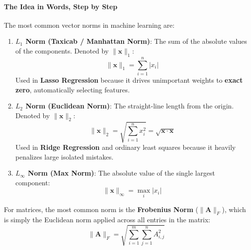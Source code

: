 \paragraph{The Idea in Words, Step by Step}
The most common vector norms in machine learning are:
\begin{enumerate}
    \item \textbf{$L_1$ Norm (Taxicab / Manhattan Norm)}: The sum of the absolute values of the components. Denoted by $\|\mathbf{x}\|_1$:
    \begin{equation}
    \|\mathbf{x}\|_1 = \sum_{i=1}^n |x_i|\label{eq:l1_norm}
    \end{equation}
    Used in \textbf{Lasso Regression} because it drives unimportant weights to \textbf{exact zero}, automatically selecting features.
    
    \item \textbf{$L_2$ Norm (Euclidean Norm)}: The straight-line length from the origin. Denoted by $\|\mathbf{x}\|_2$:
    \begin{equation}
    \|\mathbf{x}\|_2 = \sqrt{\sum_{i=1}^n x_i^2} = \sqrt{\mathbf{x} \cdot \mathbf{x}}\label{eq:l2_norm}
    \end{equation}
    Used in \textbf{Ridge Regression} and ordinary least squares because it heavily penalizes large isolated mistakes.
    
    \item \textbf{$L_\infty$ Norm (Max Norm)}: The absolute value of the single largest component:
    \begin{equation}
    \|\mathbf{x}\|_\infty = \max_{i} |x_i|\label{eq:linf_norm}
    \end{equation}
\end{enumerate}

For matrices, the most common norm is the \textbf{Frobenius Norm} ($\|\mathbf{A}\|_F$), which is simply the Euclidean norm applied across all entries in the matrix:
\begin{equation}
\|\mathbf{A}\|_F = \sqrt{\sum_{i=1}^m \sum_{j=1}^n A_{i,j}^2}\label{eq:frobenius_norm}
\end{equation}

